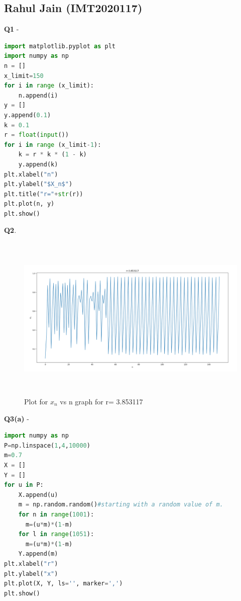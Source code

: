 \documentclass[11pt]{scrartcl} %
\begin{document}
\subsection{Rahul Jain (IMT2020117)}
\textbf{Q1} -
\begin{lstlisting}[language=Python, caption= Code for plotting $X_n$ vs n graph for a given r]
import matplotlib.pyplot as plt
import numpy as np
n = []
x_limit=150
for i in range (x_limit):
    n.append(i)
y = []
y.append(0.1)
k = 0.1
r = float(input())
for i in range (x_limit-1):
    k = r * k * (1 - k)
    y.append(k)
plt.xlabel("n")
plt.ylabel("$X_n$")
plt.title("r="+str(r))
plt.plot(n, y)
plt.show() 
\end{lstlisting}
\textbf{Q2}.
\begin{figure}[h] %
	\centering
	\includegraphics[width=12cm, height=8cm]{Rahul_singer.png} %
	\caption {Plot for $x_n$ vs n graph for r= 3.853117}
\end{figure}
\newpage
\textbf{Q3(a)} -
\begin{lstlisting}[language=Python, caption= Bifurcation diagram]
import numpy as np
P=np.linspace(1,4,10000)
m=0.7
X = []
Y = []
for u in P:
    X.append(u)
    m = np.random.random()#starting with a random value of m.
    for n in range(1001):
      m=(u*m)*(1-m)
    for l in range(1051):
      m=(u*m)*(1-m)
    Y.append(m)
plt.xlabel("r")
plt.ylabel("x")
plt.plot(X, Y, ls='', marker=',')
plt.show()
\end{lstlisting}
\newpage
\end{document}
